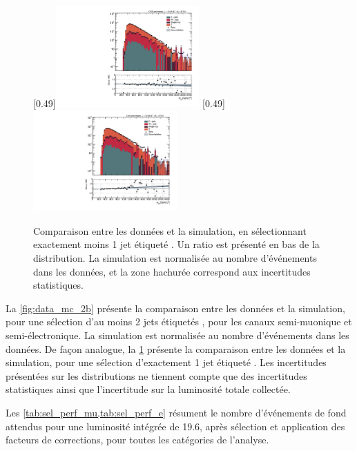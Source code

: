  \begin{figure}[p!] \centering
    [0.49\textwidth]{\includegraphics[width=0.49\textwidth,angle=-90,origin=c]{chapitre7/figs/data_mc/1btag/semimu/hmttSelected_btag_sel.pdf}} \hfill
    [0.49\textwidth]{\includegraphics[width=0.49\textwidth,angle=-90,origin=c]{chapitre7/figs/data_mc/1btag/semie/hmttSelected_btag_sel.pdf}}
    \caption{Comparaison entre les données et la simulation, en sélectionnant exactement moins 1 jet étiqueté \Pbottom{}. Un ratio est présenté en bas de la distribution. La simulation est normalisée au nombre d'événements dans les données, et la zone hachurée correspond aux incertitudes statistiques.}
    \label{fig:data_mc_1b}
\end{figure}

La \cref{fig:data_mc_2b} présente la comparaison entre les données et la simulation, pour une sélection d'au moins 2 jets étiquetés \Pbottom, pour les canaux semi-muonique et semi-électronique. La simulation est normalisée au nombre d'événements dans les données. De façon analogue, la \cref{fig:data_mc_1b} présente la comparaison entre les données et la simulation, pour une sélection d'exactement 1 jet étiqueté \Pbottom. Les incertitudes présentées sur les distributions ne tiennent compte que des incertitudes statistiques ainsi que l'incertitude sur la luminosité totale collectée.

\medskip

Les \cref{tab:sel_perf_mu,tab:sel_perf_e} résument le nombre d'événements de fond attendus pour une luminosité intégrée de \SI{19.6}{\invfb}, après sélection et application des facteurs de corrections, pour toutes les catégories de l'analyse.

